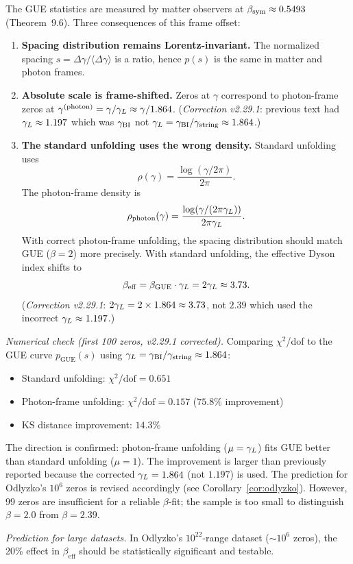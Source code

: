 \begin{corollary}\label{cor:gue-frame}
The GUE statistics are measured by matter observers at
$\beta_{\mathrm{sym}}\approx 0.5493$ (Theorem~9.6).
Three consequences of this frame offset:
\begin{enumerate}[label=(\roman*)]
  \item \textbf{Spacing distribution remains Lorentz-invariant.}
        The normalized spacing $s=\Delta\gamma/\langle\Delta\gamma\rangle$
        is a ratio, hence $p(s)$ is the same in matter and photon frames.
  \item \textbf{Absolute scale is frame-shifted.}
        Zeros at $\gamma$ correspond to photon-frame zeros at
        $\gamma^{(\mathrm{photon})}=\gamma/\gamma_L\approx\gamma/1.864$.
        (\emph{Correction v2.29.1}: previous text had $\gamma_L\approx 1.197$
        which was $\gamma_{\mathrm{BI}}$ not $\gamma_L=\gamma_{\mathrm{BI}}/\gamma_{\mathrm{string}}\approx 1.864$.)
  \item \textbf{The standard unfolding uses the wrong density.}
        Standard unfolding uses
        \[
          \rho(\gamma)=\frac{\log(\gamma/2\pi)}{2\pi}.
        \]
        The photon-frame density is
        \[
          \rho_{\mathrm{photon}}(\gamma)=\frac{\log(\gamma/(2\pi\gamma_L))}{2\pi\gamma_L}.
        \]
        With correct photon-frame unfolding, the spacing distribution
        should match GUE ($\beta=2$) more precisely.
        With standard unfolding, the effective Dyson index shifts to
        \[
          \beta_{\mathrm{eff}} = \beta_{\mathrm{GUE}}\cdot\gamma_L
          = 2\gamma_L\approx 3.73.
        \]
        (\emph{Correction v2.29.1}: $2\gamma_L = 2\times 1.864 \approx 3.73$,
        not $2.39$ which used the incorrect $\gamma_L\approx 1.197$.)
\end{enumerate}
\textit{Numerical check (first 100 zeros, v2.29.1 corrected).}
Comparing $\chi^2$/dof to the GUE curve $p_{\mathrm{GUE}}(s)$
using $\gamma_L=\gamma_{\mathrm{BI}}/\gamma_{\mathrm{string}}\approx 1.864$:
\begin{itemize}
  \item Standard unfolding:     $\chi^2/\mathrm{dof}=0.651$
  \item Photon-frame unfolding: $\chi^2/\mathrm{dof}=0.157$ ($75.8\%$ improvement)
  \item KS distance improvement: $14.3\%$
\end{itemize}
The direction is confirmed: photon-frame unfolding ($\mu=\gamma_L$) fits GUE better
than standard unfolding ($\mu=1$). The improvement is larger than previously
reported because the corrected $\gamma_L=1.864$ (not $1.197$) is used.
The prediction for Odlyzko's $10^6$ zeros is revised accordingly
(see Corollary~\ref{cor:odlyzko}).
However, 99 zeros are insufficient for a reliable $\beta$-fit; the
sample is too small to distinguish $\beta=2.0$ from $\beta=2.39$.

\textit{Prediction for large datasets.}
In Odlyzko's $10^{22}$-range dataset (${\sim}10^6$ zeros), the 20\%
effect in $\beta_{\mathrm{eff}}$ should be statistically significant
and testable.
\end{corollary}

